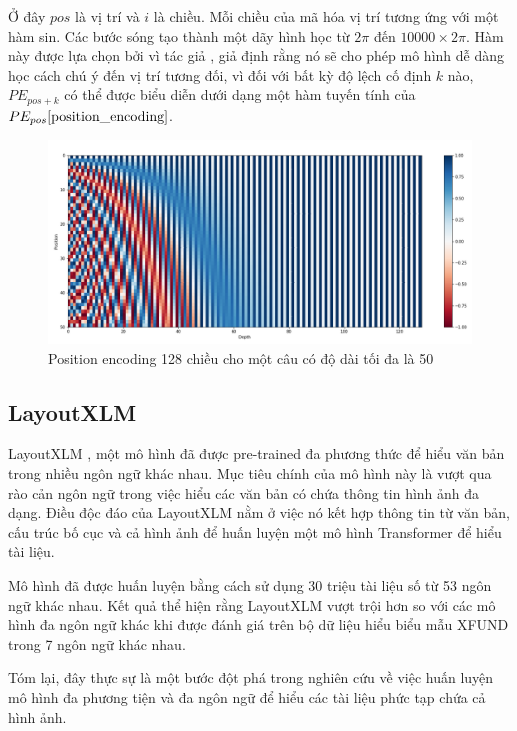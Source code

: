 Ở đây $pos$ là vị trí và $i$ là chiều. Mỗi chiều của mã hóa vị trí tương ứng với một hàm sin. Các bước sóng tạo thành một dãy hình học từ $2\pi$ đến $10000 \times 2\pi$. Hàm này được lựa chọn bởi vì tác giả \cite{vaswani2023attention}, giả định rằng nó sẽ cho phép mô hình dễ dàng học cách chú ý đến vị trí tương đối, vì đối với bất kỳ độ lệch cố định $k$ nào, $PE_{pos+k}$ có thể được biểu diễn dưới dạng một hàm tuyến tính của $PE_{pos} \ref{position_encoding}$.
\begin{figure}[h]
    \includegraphics[scale=0.40]{chapter2/images/positional_encoding.png}
    \centering
    \caption{Position encoding 128 chiều cho một câu có độ dài tối đa là 50}
    \label{position_encoding}
\end{figure}

\subsection{LayoutXLM}
LayoutXLM \cite{xu2021layoutxlm}, một mô hình đã được pre-trained đa phương thức để hiểu văn bản trong nhiều ngôn ngữ khác nhau. Mục tiêu chính của mô hình này là vượt qua rào cản ngôn ngữ trong việc hiểu các văn bản có chứa thông tin hình ảnh đa dạng. Điều độc đáo của LayoutXLM nằm ở việc nó kết hợp thông tin từ văn bản, cấu trúc bố cục và cả hình ảnh để huấn luyện một mô hình Transformer để hiểu tài liệu.

Mô hình đã được huấn luyện bằng cách sử dụng 30 triệu tài liệu số từ 53 ngôn ngữ khác nhau. Kết quả thể hiện rằng LayoutXLM vượt trội hơn so với các mô hình đa ngôn ngữ khác khi được đánh giá trên bộ dữ liệu hiểu biểu mẫu XFUND trong 7 ngôn ngữ khác nhau.

Tóm lại, đây thực sự là một bước đột phá trong nghiên cứu về việc huấn luyện mô hình đa phương tiện và đa ngôn ngữ để hiểu các tài liệu phức tạp chứa cả hình ảnh.

